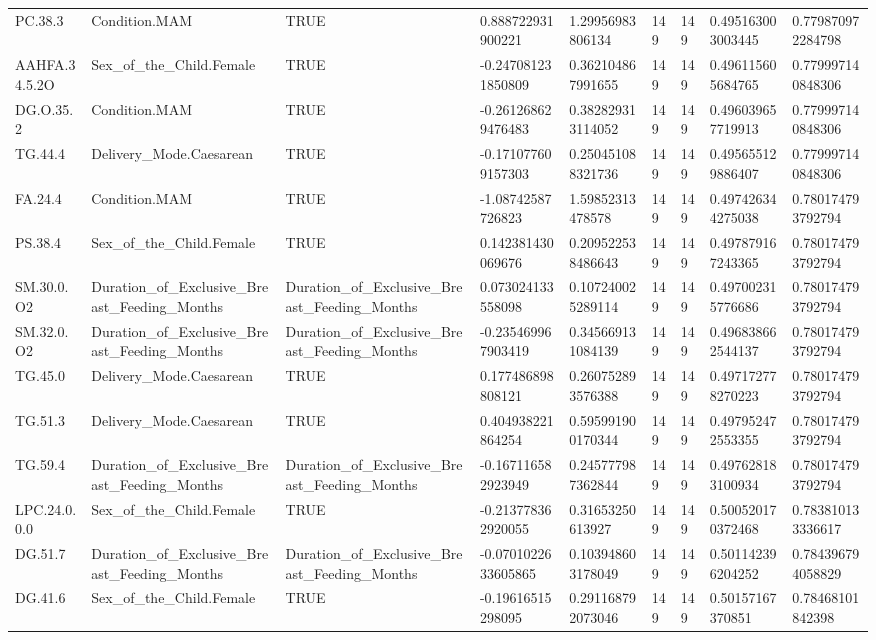 \begin{longtable}{lllllllll}
PC.38.3 & Condition.MAM & TRUE & 0.888722931900221 & 1.29956983806134 & 149 & 149 & 0.495163003003445 & 0.779870972284798 \\
AAHFA.34.5.2O & Sex\_of\_the\_Child.Female & TRUE & -0.247081231850809 & 0.362104867991655 & 149 & 149 & 0.496115605684765 & 0.779997140848306 \\
DG.O.35.2 & Condition.MAM & TRUE & -0.261268629476483 & 0.382829313114052 & 149 & 149 & 0.496039657719913 & 0.779997140848306 \\
TG.44.4 & Delivery\_Mode.Caesarean & TRUE & -0.171077609157303 & 0.250451088321736 & 149 & 149 & 0.495655129886407 & 0.779997140848306 \\
FA.24.4 & Condition.MAM & TRUE & -1.08742587726823 & 1.59852313478578 & 149 & 149 & 0.497426344275038 & 0.780174793792794 \\
PS.38.4 & Sex\_of\_the\_Child.Female & TRUE & 0.142381430069676 & 0.209522538486643 & 149 & 149 & 0.497879167243365 & 0.780174793792794 \\
SM.30.0.O2 & Duration\_of\_Exclusive\_Breast\_Feeding\_Months & Duration\_of\_Exclusive\_Breast\_Feeding\_Months & 0.073024133558098 & 0.107240025289114 & 149 & 149 & 0.497002315776686 & 0.780174793792794 \\
SM.32.0.O2 & Duration\_of\_Exclusive\_Breast\_Feeding\_Months & Duration\_of\_Exclusive\_Breast\_Feeding\_Months & -0.235469967903419 & 0.345669131084139 & 149 & 149 & 0.496838662544137 & 0.780174793792794 \\
TG.45.0 & Delivery\_Mode.Caesarean & TRUE & 0.177486898808121 & 0.260752893576388 & 149 & 149 & 0.497172778270223 & 0.780174793792794 \\
TG.51.3 & Delivery\_Mode.Caesarean & TRUE & 0.404938221864254 & 0.595991900170344 & 149 & 149 & 0.497952472553355 & 0.780174793792794 \\
TG.59.4 & Duration\_of\_Exclusive\_Breast\_Feeding\_Months & Duration\_of\_Exclusive\_Breast\_Feeding\_Months & -0.167116582923949 & 0.245777987362844 & 149 & 149 & 0.497628183100934 & 0.780174793792794 \\
LPC.24.0.0.0 & Sex\_of\_the\_Child.Female & TRUE & -0.213778362920055 & 0.31653250613927 & 149 & 149 & 0.500520170372468 & 0.783810133336617 \\
DG.51.7 & Duration\_of\_Exclusive\_Breast\_Feeding\_Months & Duration\_of\_Exclusive\_Breast\_Feeding\_Months & -0.0701022633605865 & 0.103948603178049 & 149 & 149 & 0.501142396204252 & 0.784396794058829 \\
DG.41.6 & Sex\_of\_the\_Child.Female & TRUE & -0.19616515298095 & 0.291168792073046 & 149 & 149 & 0.50157167370851 & 0.78468101842398 \\

\end{longtable}
